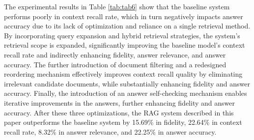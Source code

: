The experimental results in Table \ref{tab:tab6} show that the baseline system performs poorly in context recall rate, which in turn negatively impacts answer accuracy due to its lack of optimization and reliance on a single retrieval method. By incorporating query expansion and hybrid retrieval strategies, the system’s retrieval scope is expanded, significantly improving the baseline model’s context recall rate and indirectly enhancing fidelity, answer relevance, and answer accuracy. The further introduction of document filtering and a redesigned reordering mechanism effectively improves context recall quality by eliminating irrelevant candidate documents, while substantially enhancing fidelity and answer accuracy. Finally, the introduction of an answer self-checking mechanism enables iterative improvements in the answers, further enhancing fidelity and answer accuracy. After these three optimizations, the RAG system described in this paper outperforms the baseline system by 15.69\% in fidelity, 22.64\% in context recall rate, 8.32\% in answer relevance, and 22.25\% in answer accuracy.

\begin{table}[h]\small
 \caption{Ablation Experiment Results}
    \centering
     \vspace{-5pt}
\label{tab:tab6}
\end{table}

